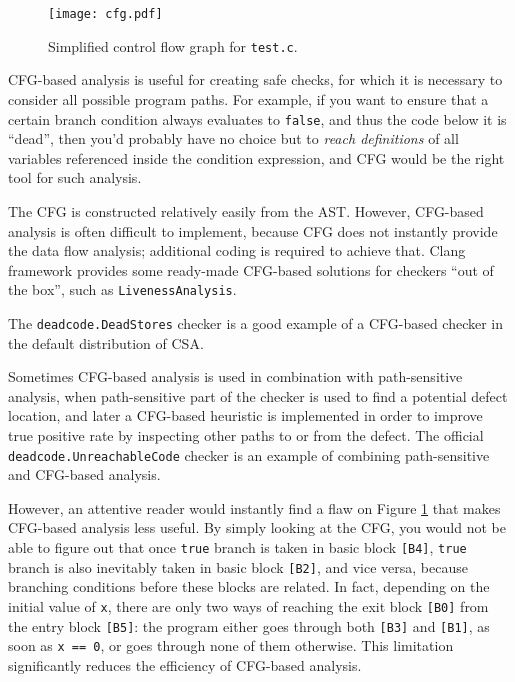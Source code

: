 \documentclass[a4paper,12pt]{article}
\begin{document}
\begin{figure}[!ht]\center
\texttt{[image: cfg.pdf]}
\caption{Simplified control flow graph for \lstinline|test.c|.}
\label{fig:cfg}
\end{figure}

CFG-based analysis is useful for creating safe checks, for which it is necessary to consider all possible program paths. For example, if you want to ensure that a certain branch condition always evaluates to \lstinline|false|, and thus the code below it is ``dead'', then you'd probably have no choice but to \emph{reach definitions} of all variables referenced inside the condition expression, and CFG would be the right tool for such analysis.

The CFG is constructed relatively easily from the AST. However, CFG-based analysis is often difficult to implement, because CFG does not instantly provide the data flow analysis; additional coding is required to achieve that. Clang framework provides some ready-made CFG-based solutions for checkers ``out of the box'', such as \lstinline|LivenessAnalysis|.

The \lstinline|deadcode.DeadStores| checker is a good example of a CFG-based checker in the default distribution of CSA.

Sometimes CFG-based analysis is used in combination with path-sensitive analysis, when path-sensitive part of the checker is used to find a potential defect location, and later a CFG-based heuristic is implemented in order to improve true positive rate by inspecting other paths to or from the defect. The official \lstinline|deadcode.UnreachableCode| checker is an example of combining path-sensitive and CFG-based analysis.

However, an attentive reader would instantly find a flaw on Figure \ref{fig:cfg} that makes CFG-based analysis less useful. By simply looking at the CFG, you would not be able to figure out that once \lstinline|true| branch is taken in basic block \lstinline|[B4]|, \lstinline|true| branch is also inevitably taken in basic block \lstinline|[B2]|, and vice versa, because branching conditions before these blocks are related. In fact, depending on the initial value of \lstinline|x|, there are only two ways of reaching the exit block \lstinline|[B0]| from the entry block \lstinline|[B5]|: the program either goes through both \lstinline|[B3]| and \lstinline|[B1]|, as soon as \lstinline|x == 0|, or goes through none of them otherwise. This limitation significantly reduces the efficiency of CFG-based analysis.
\end{document}
